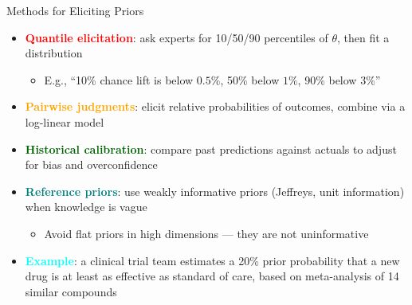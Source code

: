 \documentclass[
  10pt,
  ignorenonframetext,
]{beamer}
\providecommand{\tightlist}{%
  \setlength{\itemsep}{0pt}\setlength{\parskip}{0pt}}
\begin{document}
\begin{frame}{Methods for Eliciting Priors}
\label{methods-for-eliciting-priors}
\begin{itemize}
\item
  \textbf{\textcolor{red}{Quantile elicitation}}: ask experts for
  10/50/90 percentiles of \(\theta\), then fit a distribution

  \begin{itemize}
  \tightlist
  \item
    E.g., ``10\% chance lift is below \(0.5\%\), 50\% below \(1\%\),
    90\% below \(3\%\)''
  \end{itemize}
\item
  \textbf{\textcolor{orange}{Pairwise judgments}}: elicit relative
  probabilities of outcomes, combine via a log-linear model
\item
  \textbf{\textcolor{darkgreen}{Historical calibration}}: compare past
  predictions against actuals to adjust for bias and overconfidence
\item
  \textbf{\textcolor{teal}{Reference priors}}: use weakly informative
  priors (Jeffreys, unit information) when knowledge is vague

  \begin{itemize}
  \tightlist
  \item
    Avoid flat priors in high dimensions --- they are not uninformative
  \end{itemize}
\item
  \textbf{\textcolor{cyan}{Example}}: a clinical trial team estimates a
  20\% prior probability that a new drug is at least as effective as
  standard of care, based on meta-analysis of 14 similar compounds
\end{itemize}
\end{frame}
\end{document}
